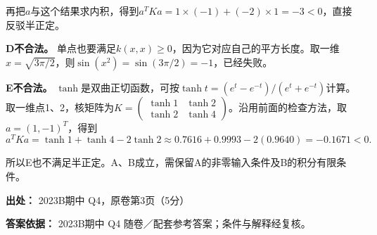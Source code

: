 再把\(a\)与这个结果求内积，得到\(a^TKa=1\times(-1)+(-2)\times1=-3<0\)，直接反驳半正定。


\textbf{D不合法。} 单点也要满足\(k(x,x)\ge0\)，因为它对应自己的平方长度。取一维\(x=\sqrt{3\pi/2}\)，则\(\sin(x^2)=\sin(3\pi/2)=-1\)，已经失败。


\textbf{E不合法。} \(\tanh\)是双曲正切函数，可按\(\tanh t=(e^t-e^{-t})/(e^t+e^{-t})\)计算。取一维点1、2，核矩阵为\(K=\begin{pmatrix}\tanh1&\tanh2\\\tanh2&\tanh4\end{pmatrix}\)。沿用前面的检查方法，取\(a=(1,-1)^T\)，得到
\[
a^TKa=\tanh1+\tanh4-2\tanh2
\approx0.7616+0.9993-2(0.9640)=-0.1671<0.
\]


所以E也不满足半正定。A、B成立，需保留A的非零输入条件及B的积分有限条件。


\textbf{出处：} 2023B期中 Q4，原卷第3页（5分）


\textbf{答案依据：} 2023B期中 Q4 随卷／配套参考答案；条件与解释经复核。
